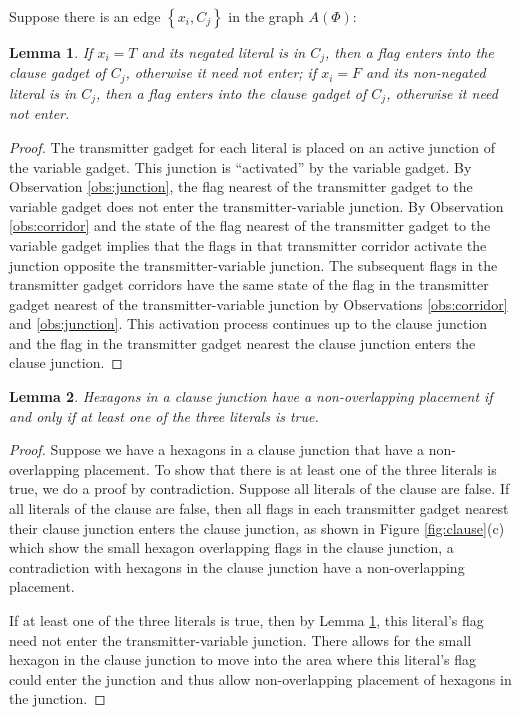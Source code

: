 \documentclass[10pt]{CSUNthesis}
\theoremstyle{plain}%
\newtheorem{lem}{Lemma}
\theoremstyle{definition}
\theoremstyle{remark}
\begin{document}
Suppose there is an edge $\left\lbrace x_i, C_j \right\rbrace$ in the graph $A(\Phi)$:
\begin{lem}\label{lem:aux-3}
If $x_i = T$ and its negated literal is in $C_j$, then a flag enters into the clause gadget of $C_j$, otherwise it need not enter; if $x_i = F$ and its non-negated literal is in $C_j$, then a flag enters into the clause gadget of $C_j$, otherwise it need not enter.
\end{lem}
\begin{proof}
The transmitter gadget for each literal is placed on an active junction of the variable gadget. 
This junction is ``activated'' by the variable gadget.  
By Observation \ref{obs:junction}, the flag nearest of the transmitter gadget to the variable gadget does not enter the transmitter-variable junction.
By Observation \ref{obs:corridor} and the state of the flag nearest of the transmitter gadget to the variable gadget implies that the flags in that transmitter corridor activate the junction opposite the transmitter-variable junction.
The subsequent flags in the transmitter gadget corridors have the same state of the flag in the transmitter gadget nearest of the transmitter-variable junction by Observations \ref{obs:corridor} and \ref{obs:junction}.
This activation process continues up to the clause junction and the flag in the transmitter gadget nearest the clause junction enters the clause junction.
\end{proof}

\begin{lem}\label{lem:aux-1}
Hexagons in a clause junction have a non-overlapping placement if and only if at least one of the three literals is true.
\end{lem}
\begin{proof}
Suppose we have a hexagons in a clause junction that have a non-overlapping placement.
To show that there is at least one of the three literals is true,  we do a proof by contradiction.
Suppose all literals of the clause are false.
If all literals of the clause are false, then all flags in each transmitter gadget nearest their clause junction enters the clause junction, as shown in Figure \ref{fig:clause}(c) which show the small hexagon overlapping flags in the clause junction, a contradiction with hexagons in the clause junction have a non-overlapping placement.

If at least one of the three literals is true, then by Lemma \ref{lem:aux-3}, this literal's flag need not enter the transmitter-variable junction.
There allows for the small hexagon in the clause junction to move into the area where this literal's flag could enter the junction and thus allow non-overlapping placement of hexagons in the junction.
\end{proof}
\end{document}
